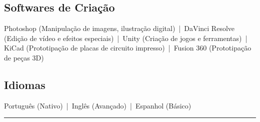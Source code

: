 \documentclass[a4paper,10pt]{article}
\newcommand{\sectionend}{
  \par\addvspace{0.75em}
  \hrule
  \addvspace{0.75em}
}
\begin{document}
    \subsection*{Softwares de Criação}
    {\ttfamily
    Photoshop (Manipulação de imagens, ilustração digital) \,|\, 
    DaVinci Resolve (Edição de vídeo e efeitos especiais) \,|\, 
    Unity (Criação de jogos e ferramentas) \,|\, 
    KiCad (Prototipação de placas de circuito impresso) \,|\, 
    Fusion 360 (Prototipação de peças 3D)
    }
    \vspace{0.2em}
    \subsection*{Idiomas}
    {\ttfamily
    Português (Nativo) \,|\, 
    Inglês (Avançado) \,|\, 
    Espanhol (Básico)
    }
\sectionend
\end{document}
